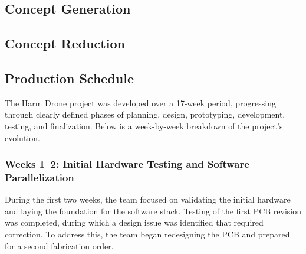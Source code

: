 \documentclass[12pt]{article}
\begin{document}
\subsection{Concept Generation}

\subsection{Concept Reduction}

\subsection{Production Schedule}

The Harm Drone project was developed over a 17-week period, progressing through clearly defined phases of planning, design, prototyping, development, testing, and finalization. Below is a week-by-week breakdown of the project's evolution.

\subsubsection*{Weeks 1–2: Initial Hardware Testing and Software Parallelization}

During the first two weeks, the team focused on validating the initial hardware and laying the foundation for the software stack. Testing of the first PCB revision was completed, during which a design issue was identified that required correction. To address this, the team began redesigning the PCB and prepared for a second fabrication order.
\end{document}
